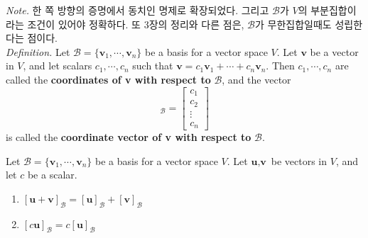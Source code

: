 \textit{Note.} 한 쪽 방향의 증명에서 동치인 명제로 확장되었다. 그리고 $\mathcal{B}$가 $V$의 부분집합이라는 조건이 있어야 정확하다. 또 3장의 정리와 다른 점은, $\mathcal{B}$가 무한집합일때도 성립한다는 점이다. \\

\textit{Definition.} Let $\mathcal{B} = \{ \textbf{v}_1, \cdots, \textbf{v}_n \}$ be a basis for a vector space $V$. Let $\textbf{v}$ be a vector in $V$, and let scalars $c_1, \cdots, c_n$ such that $\textbf{v} = c_1\textbf{v}_1 + \cdots + c_n\textbf{v}_n$. Then $c_1, \cdots, c_n$ are called the \textbf{coordinates of v with respect to} $\mathcal{B}$, and the vector \begin{equation*}
	[\textbf{v}]_\mathcal{B} = \begin{bmatrix}
		c_1 \\ c_2 \\ \vdots \\ c_n
	\end{bmatrix}
\end{equation*} is called the \textbf{coordinate vector of v with respect to} $\mathcal{B}$.

\begin{theorem}
	Let $\mathcal{B} = \{ \textbf{v}_1, \cdots, \textbf{v}_n \}$ be a basis for a vector space $V$. Let $\textbf{u}, \textbf{v}$ be vectors in $V$, and let $c$ be a scalar. \begin{enumerate}
		\item $[\textbf{u} + \textbf{v}]_\mathcal{B} = [\textbf{u}]_\mathcal{B} + [\textbf{v}]_\mathcal{B}$
		\item $[c\textbf{u}]_\mathcal{B} = c[\textbf{u}]_\mathcal{B}$
	\end{enumerate}
\end{theorem}

